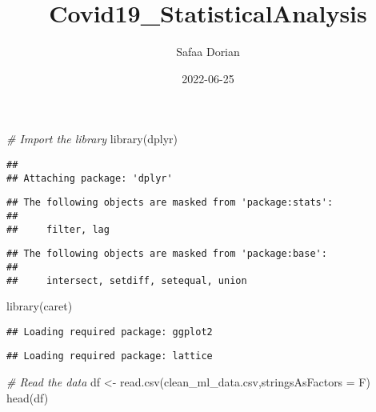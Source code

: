 \documentclass[
]{article}
\title{Covid19\_StatisticalAnalysis}
\author{Safaa Dorian}
\date{2022-06-25}
\newenvironment{Shaded}{\begin{snugshade}}{\end{snugshade}}
\newcommand{\AttributeTok}[1]{\textcolor[rgb]{0.77,0.63,0.00}{#1}}
\newcommand{\CommentTok}[1]{\textcolor[rgb]{0.56,0.35,0.01}{\textit{#1}}}
\newcommand{\FunctionTok}[1]{\textcolor[rgb]{0.00,0.00,0.00}{#1}}
\newcommand{\NormalTok}[1]{#1}
\newcommand{\OtherTok}[1]{\textcolor[rgb]{0.56,0.35,0.01}{#1}}
\newcommand{\StringTok}[1]{\textcolor[rgb]{0.31,0.60,0.02}{#1}}
\begin{document}
\maketitle

\begin{Shaded}
\begin{Highlighting}[]
\CommentTok{\# Import the library}
\FunctionTok{library}\NormalTok{(dplyr)}
\end{Highlighting}
\end{Shaded}

\begin{verbatim}
## 
## Attaching package: 'dplyr'
\end{verbatim}

\begin{verbatim}
## The following objects are masked from 'package:stats':
## 
##     filter, lag
\end{verbatim}

\begin{verbatim}
## The following objects are masked from 'package:base':
## 
##     intersect, setdiff, setequal, union
\end{verbatim}

\begin{Shaded}
\begin{Highlighting}[]
\FunctionTok{library}\NormalTok{(caret)}
\end{Highlighting}
\end{Shaded}

\begin{verbatim}
## Loading required package: ggplot2
\end{verbatim}

\begin{verbatim}
## Loading required package: lattice
\end{verbatim}

\begin{Shaded}
\begin{Highlighting}[]
\CommentTok{\# Read the data}
\NormalTok{df }\OtherTok{\textless{}{-}} \FunctionTok{read.csv}\NormalTok{(}\StringTok{\textquotesingle{}clean\_ml\_data.csv\textquotesingle{}}\NormalTok{,}\AttributeTok{stringsAsFactors =}\NormalTok{ F)}
\FunctionTok{head}\NormalTok{(df)}
\end{Highlighting}
\end{Shaded}
\end{document}
